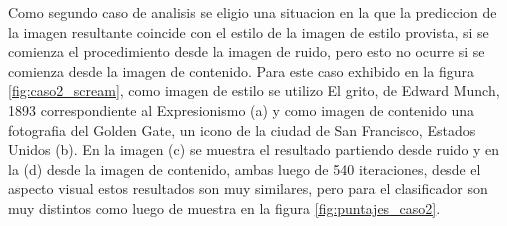 \documentclass[a4paper,11pt,spanish]{book}
\begin{document}
	Como segundo caso de analisis se eligio una situacion en la que la prediccion de la imagen resultante coincide con el estilo de la imagen de estilo provista, si se comienza
	el procedimiento desde la imagen de ruido, pero esto no ocurre si se comienza desde la imagen de contenido.
	Para este caso exhibido en la figura \ref{fig:caso2_scream}, como imagen de estilo se utilizo El grito, de Edward Munch, 1893 correspondiente al Expresionismo (a) y como imagen de contenido una fotografia del Golden Gate, un
	icono de la ciudad de San Francisco, Estados Unidos (b). En la imagen (c) se muestra el resultado partiendo desde ruido y en la (d) desde la imagen de contenido, ambas luego de
	540 iteraciones, desde el aspecto visual estos resultados son muy similares, pero para el clasificador son muy distintos como luego de muestra en la figura \ref{fig:puntajes_caso2}.
      
\end{document}
